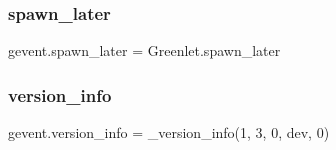 \subsubsection{\texorpdfstring{spawn\+\_\+later}{spawn\_later}}
{\footnotesize\ttfamily gevent.\+spawn\+\_\+later = Greenlet.\+spawn\+\_\+later}

\mbox{\label{namespacegevent_a03b02b5a1aefb0e7023097fc8f1f2df1}} 
\subsubsection{\texorpdfstring{version\+\_\+info}{version\_info}}
{\footnotesize\ttfamily gevent.\+version\+\_\+info = \+\_\+version\+\_\+info(1, 3, 0, \textquotesingle{}dev\textquotesingle{}, 0)}

